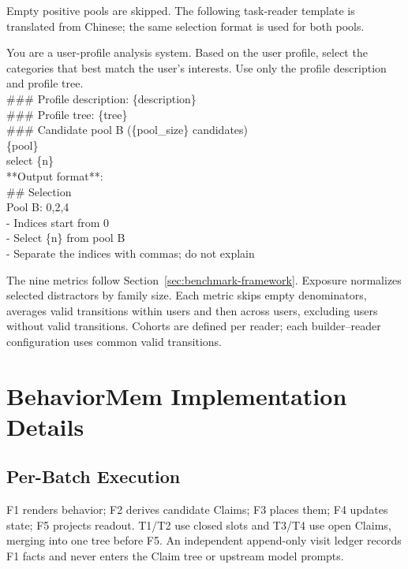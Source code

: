 \documentclass[sigconf,nonacm,balance=false]{acmart}
\begin{document}
Empty positive pools are skipped. The following task-reader template is translated from Chinese; the same selection format is used for both pools.

\begin{tcolorbox}[breakable, colback=black!2, colframe=black!25, boxrule=0.3pt, arc=1mm, left=4pt, right=4pt, top=3pt, bottom=3pt, before skip=4pt, after skip=4pt]
\footnotesize\ttfamily\RaggedRight
You are a user-profile analysis system. Based on the user profile, select the categories that best match the user's interests. Use only the profile description and profile tree.\\[0.3em]
\#\#\# Profile description: \{description\}\\
\#\#\# Profile tree: \{tree\}\\
\#\#\# Candidate pool B (\{pool\_size\} candidates)\\
\{pool\}\\
select \{n\}\\[0.3em]
**Output format**:\\
\#\# Selection\\
Pool B: 0,2,4\\
- Indices start from 0\\
- Select \{n\} from pool B\\
- Separate the indices with commas; do not explain
\end{tcolorbox}

The nine metrics follow Section~\ref{sec:benchmark-framework}. Exposure normalizes selected distractors by family size. Each metric skips empty denominators, averages valid transitions within users and then across users, excluding users without valid transitions. Cohorts are defined per reader; each builder--reader configuration uses common valid transitions.

\section{BehaviorMem Implementation Details}
\label{app:method}

\subsection{Per-Batch Execution}
\label{app:method-exec}
F1 renders behavior; F2 derives candidate Claims; F3 places them; F4 updates state; F5 projects readout. T1/T2 use closed slots and T3/T4 use open Claims, merging into one tree before F5. An independent append-only visit ledger records F1 facts and never enters the Claim tree or upstream model prompts.
\end{document}
